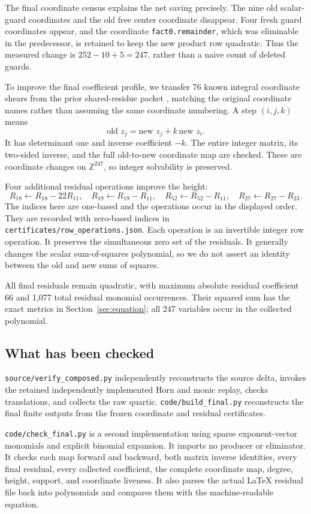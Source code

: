 \documentclass[11pt,letterpaper]{article}
\newcommand{\ZZ}{\mathbb Z}
\newcommand{\file}[1]{\texttt{\nolinkurl{#1}}}
\begin{document}
The final coordinate census explains the net saving precisely.
The nine old scalar-guard coordinates and the old free center coordinate
disappear. Four fresh guard coordinates appear, and the coordinate
\file{fact0.remainder}, which was eliminable in the predecessor, is
retained to keep the new product row quadratic. Thus the measured
change is $252-10+5=247$, rather than a naive count of deleted guards.

To improve the final coefficient profile, we transfer 76 known
integral coordinate shears from the prior shared-residue packet
\cite{shared}, matching the original coordinate names rather than
assuming the same coordinate numbering. A step $(i,j,k)$ means
\[
 \text{old }z_j=\text{new }z_j+k\,\text{new }z_i.
\]
It has determinant one and inverse coefficient $-k$.
The entire integer matrix, its two-sided inverse, and the full old-to-new
coordinate map are checked. These are coordinate changes on
$\ZZ^{247}$, so integer solvability is preserved.

Four additional residual operations improve the height:
\[
 R_{18}\leftarrow R_{18}-22R_{11},\quad
 R_{19}\leftarrow R_{19}-R_{11},\quad
 R_{52}\leftarrow R_{52}-R_{11},\quad
 R_{27}\leftarrow R_{27}-R_{23}.
\]
The indices here are one-based and the operations occur in the displayed
order. They are recorded with zero-based indices in
\file{certificates/row_operations.json}.
Each operation is an invertible integer row operation. It preserves
the simultaneous zero set of the residuals. It generally changes
the scalar sum-of-squares polynomial, so we do not assert an identity
between the old and new sums of squares.

All final residuals remain quadratic, with maximum absolute residual
coefficient $66$ and 1,077 total residual monomial occurrences.
Their squared sum has the exact metrics in Section~\ref{sec:equation};
all 247 variables occur in the collected polynomial.

\subsection{What has been checked}

\file{source/verify_composed.py} independently reconstructs the source
delta, invokes the retained independently implemented Horn and monic
replay, checks translations, and collects the raw quartic.
\file{code/build_final.py} reconstructs the final finite outputs from
the frozen coordinate and residual certificates.

\file{code/check_final.py} is a second implementation using sparse
exponent-vector monomials and explicit binomial expansion. It imports
no producer or eliminator. It checks each map forward and backward,
both matrix inverse identities, every final residual, every collected
coefficient, the complete coordinate map, degree, height, support,
and coordinate liveness. It also parses the actual LaTeX residual
file back into polynomials and compares them with the machine-readable
equation.
\end{document}
